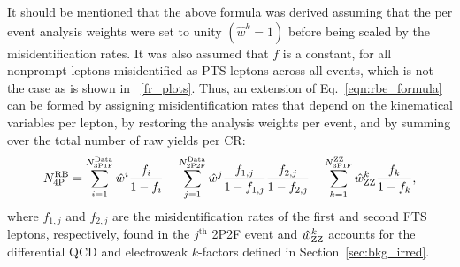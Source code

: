 It should be mentioned that the above formula was derived assuming that the per event analysis weights were set to unity $\left( \hat{w}^k = 1 \right)$ before being scaled by the misidentification rates.
It was also assumed that $f$ is a constant, for all nonprompt leptons misidentified as PTS leptons across all events, which is not the case as is shown in \figurename~\ref{fr_plots}.
Thus, an extension of Eq.~\ref{eqn:rbe_formula} can be formed by assigning misidentification rates that depend on the kinematical variables per lepton,
by restoring the analysis weights per event,
and by summing over the total number of raw yields per CR:
\begin{equation}
	\label{eqn:rbe_formula_final}
	N_{\mathrm{4P}}^{\mathrm{RB}} =
	  \sum_{i=1}^{N_{\mathrm{3P1F}}^\mathrm{Data}} \hat{w}^i \frac{f_i}{1 - f_i}
	- \sum_{j=1}^{N_{\mathrm{2P2F}}^{\mathrm{Data}}} \hat{w}^j \frac{f_{1,j}}{1 - f_{1,j}}\frac{f_{2,j}}{1 - f_{2,j}}
	- \sum_{k=1}^{N_{\mathrm{3P1F}}^{\mathrm{ZZ}}} \hat{w}^k_{\mathrm{Z}\mathrm{Z}} \frac{f_k}{1 - f_k},
\end{equation}
where $f_{1,j}$ and $f_{2,j}$ are the misidentification rates of the first and second FTS leptons, respectively, found in the $j^{\text{th}}$ 2P2F event
and $\hat{w}^k_{\mathrm{Z}\mathrm{Z}}$ accounts for the differential QCD and electroweak $k$-factors defined in Section~\ref{sec:bkg_irred}.

